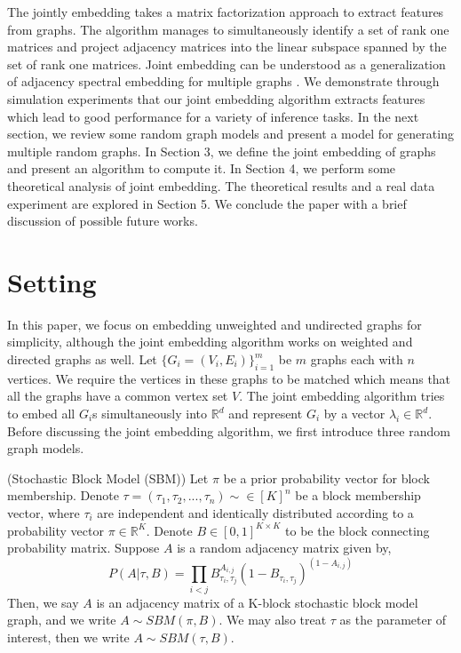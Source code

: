 \documentclass[10pt,journal,compsoc]{IEEEtran}
\newenvironment{definition}[1][Definition]{\begin{trivlist}
		\item[\hskip \labelsep {\bfseries #1}]}{\end{trivlist}}
\begin{document}
\noindent The jointly embedding takes a matrix factorization approach to extract features from graphs. The algorithm manages to simultaneously identify a set of rank one matrices and project adjacency matrices into the linear subspace spanned by the set of rank one matrices. Joint embedding can be understood as a generalization of adjacency spectral embedding for multiple graphs \cite{sussman2012consistent}. We demonstrate through simulation experiments that our joint embedding algorithm extracts features which lead to good performance for a variety of inference tasks. In the next section, we review some random graph models and present a model for generating multiple random graphs. In Section 3, we define the joint embedding of graphs and present an algorithm to compute it. In Section 4, we perform some theoretical analysis of joint embedding. The theoretical results and a real data experiment are explored in Section 5. We conclude the paper with a brief discussion of possible future works.

\section{Setting}
In this paper, we focus on embedding unweighted and undirected graphs for simplicity, although the joint embedding algorithm works on weighted and directed graphs as well. Let $\{G_i=(V_i,E_i)\} _{i=1}^{m}$ be $m$ graphs each with $n$ vertices. We require the vertices in these graphs to be matched which means that all the graphs have a common vertex set $V$. The joint embedding algorithm tries to embed all $G_i$s simultaneously into $\mathbb{R}^d$ and represent $G_i$  by a vector $\lambda_i \in \mathbb{R}^d$. Before discussing the joint embedding algorithm, we first introduce three random graph models.

\begin{definition} (Stochastic Block Model (SBM)) Let $\pi$ be a prior probability vector for block membership. Denote $\tau=(\tau_1,\tau_2,...,\tau_n) \sim \in [K]^n$ be a block membership vector, where $\tau_i$ are independent and identically distributed according to a probability vector $\pi \in \mathbb{R}^K$. Denote $B \in [0,1]^{K \times K}$ to be the block connecting probability matrix. Suppose $A$ is a random adjacency matrix given by,
\[ P(A|\tau,B)= \prod_{i<j} B_{\tau_i,\tau_j}^{A_{i,j}} (1-B_{\tau_i,\tau_j})^{(1-A_{i,j})}\] 
Then, we say $A$ is an adjacency matrix of a K-block stochastic block model graph, and we write $A \sim SBM(\pi,B)$. We may also treat $\tau$ as the parameter of interest, then we write $A \sim SBM(\tau,B)$.
\end{definition}
\end{document}
